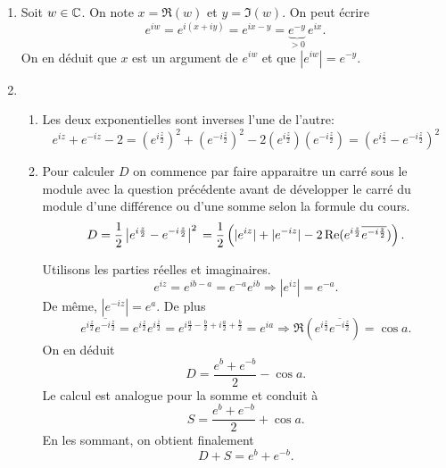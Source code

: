 \begin{enumerate}
  \item Soit $w\in \C$. On note $x = \Re(w)$ et $y = \Im(w)$. On peut écrire
\[
  e^{iw} = e^{i(x+iy)} = e^{ix - y} = \underset{> 0}{\underbrace{e^{-y}}}\, e^{ix}.
\]
On en déduit que $x$ est un argument de $e^{iw}$ et que $\left|e^{iw}\right| = e^{-y}$. 
  \item 
  \begin{enumerate}
    \item Les deux exponentielles sont inverses l'une de l'autre:
\[
  e^{iz} + e^{-iz} - 2 
  = \left( e^{i\frac{z}{2}}\right)^2 + \left( e^{-i\frac{z}{2}}\right)^2 - 2 \left( e^{i\frac{z}{2}}\right) \left( e^{-i\frac{z}{2}}\right)
  = \left( e^{i\frac{z}{2}} - e^{-i\frac{z}{2}}\right)^2
\]

    \item Pour calculer $D$ on commence par faire apparaitre un carré sous le module avec la question précédente avant de développer le carré du module d'une différence ou d'une somme selon la formule du cours.
\begin{displaymath}
 D = \frac{1}{2}\left| e^{i\frac{z}{2}} - e^{-i\frac{z}{2}} \right|^2 \\
= \frac{1}{2}\left( |e^{iz}| + |e^{-iz}| -2\Re(e^{i\frac{z}{2}} \overline{e^{-i\frac{z}{2}}})\right) .
\end{displaymath}

Utilisons les parties réelles et imaginaires.
\begin{displaymath}
 e^{iz} = e^{ib -a} = e^{-a}e^{ib} \Rightarrow |e^{iz}| = e^{-a}.
\end{displaymath}
De même, $|e^{-iz}| = e^{a}$. De plus
\begin{displaymath}
e^{i\frac{z}{2}} \overline{e^{-i\frac{z}{2}}} = e^{i\frac{z}{2}} e^{i\frac{\overline{z}}{2}} 
= e^{i\frac{a}{2}-\frac{b}{2} + i\frac{a}{2} + \frac{b}{2}}
= e^{ia}
\Rightarrow
\Re(e^{i\frac{z}{2}} \overline{e^{-i\frac{z}{2}}}) = \cos a.
\end{displaymath}
On en déduit 
\begin{displaymath}
D= \frac{e^{b} + e^{-b}}{2} - \cos a.
\end{displaymath}
Le calcul est analogue pour la somme et conduit à
\begin{displaymath}
S = \frac{e^{b} + e^{-b}}{2} + \cos a.
\end{displaymath}
En les sommant, on obtient finalement
\begin{displaymath}
 D + S = e^{b} + e^{-b}.
\end{displaymath}

  \end{enumerate}

\end{enumerate}

